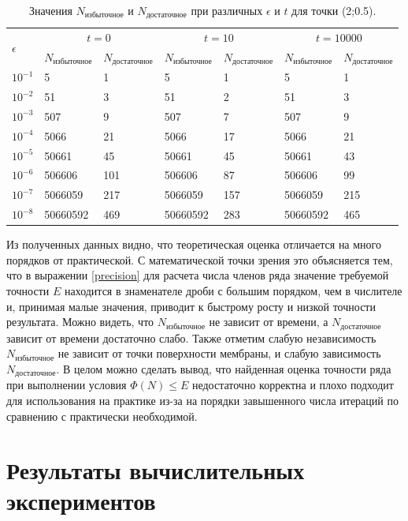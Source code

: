 {{\begin{table}[H]
\centering
\caption{Значения $N_\text{избыточное}$ и $N_\text{достаточное}$ при различных $\epsilon$ и $t$ для точки (2;0.5).}
\begin{tabularx}{\textwidth}{|Y|Y|Y|Y|Y|Y|Y|}
\hline
{} &  &  &  \\ 
 & $N_\text{избыточное}$ & $N_\text{достаточное}$  & $N_\text{избыточное}$ & $N_\text{достаточное}$  & $N_\text{избыточное}$ & $N_\text{достаточное}$  \\ \hline
$10^{-1}$ & 5 & 1 & 5 & 1 & 5 & 1 \\ \hline
$10^{-2}$ & 51 & 3 & 51 & 2 & 51 & 3 \\ \hline
$10^{-3}$ & 507 & 9 & 507 & 7 & 507 & 9 \\ \hline
$10^{-4}$ & 5066 & 21 & 5066 & 17 & 5066 & 21 \\ \hline
$10^{-5}$ & 50661 & 45 & 50661 & 45 & 50661 & 43 \\ \hline
$10^{-6}$ & 506606 & 101 & 506606 & 87 & 506606 & 99 \\ \hline
$10^{-7}$ & 5066059 & 217 & 5066059 & 157 & 5066059 & 215 \\ \hline
$10^{-8}$ & 50660592 & 469 & 50660592 & 283 & 50660592 & 465 \\ \hline
\end{tabularx}
\end{table}

Из полученных данных видно, что теоретическая оценка отличается на много порядков от практической. С математической точки зрения это объясняется тем, что в выражении \eqref{precision} для расчета числа членов ряда значение требуемой точности $E$ находится в знаменателе дроби с большим порядком, чем в числителе и, принимая малые значения, приводит к быстрому росту и низкой точности результата.
Можно видеть, что $N_\text{избыточное}$ не зависит от времени, а $N_\text{достаточное}$ зависит от времени достаточно слабо.  
Также отметим слабую независимость $N_\text{избыточное}$ не зависит от точки поверхности мембраны, и слабую зависимость $N_\text{достаточное}$.
В целом можно сделать вывод, что найденная оценка точности ряда при выполнении условия $\Phi(N) \le E$ недостаточно корректна и плохо подходит для использования на практике из-за на порядки завышенного числа итераций по сравнению с практически необходимой. 
}

\newpage
\section{Результаты вычислительных экспериментов}
{

}}

